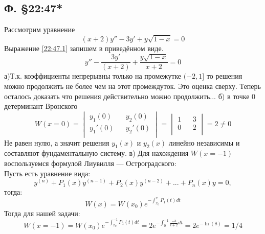 \documentclass{article}
\begin{document}
\subsection{Ф. \S22:47*}
Рассмотрим уравнение 
\begin{equation} \label{22:47.1}
(x+2)y''-3y'+y \sqrt{1-x}=0    
\end{equation}
Выражение \ref{22:47.1} запишем в приведённом виде.
\begin{equation}
    y''- \frac{3y'}{(x+2)} + \frac{y \sqrt{1-x}}{x+2}=0 
\end{equation}
а)Т.к. коэффициенты непрерывны только на промежутке $(-2,1]$ то решения можно продолжить не более чем на этот промеждуток. Это оценка сверху. Теперь осталось доказать что решения действительно можно продолжить...
б) в точке 0 детерминант Вронского
\begin{equation*}
W(x=0)=
\begin{vmatrix}
y_1(0) && y_2(0)\\
y_1'(0) && y_2'(0)\\
\end{vmatrix}
=
\begin{vmatrix}
1 && 3\\
0 && 2\\
\end{vmatrix}
= 2 \neq 0
\end{equation*}
Не равен нулю, а значит решения $y_1(x)$ и $y_2(x)$ линейно независимы и составляют фундаментальную систему.
в) Для нахождения $W(x=-1)$ воспользуемся формулой Лиувилля — Остроградского: \\
Пусть есть уравнение вида:
\begin{equation}
    y^{(n)}+P_{1}(x)y^{(n-1)}+P_{2}(x)y^{(n-2)}+...+P_{n}(x)y=0,
\end{equation}
тогда:
\begin{equation}
    W(x)=W(x_0) e^{-\int_{x_0}^x P_1(t)dt}
\end{equation}
Тогда для нашей задачи:
\begin{equation}
    W(x=-1)=W(x_0) e^{-\int_{x_0}^{-1} P_1(t)dt}=2 e^{-\int_{0}^{-1} \frac{-3}{t+2}dt}=2 e^{-\ln(8)}=1/4
\end{equation}
\end{document}
